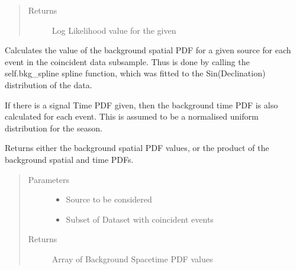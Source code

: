 \documentclass[letterpaper,10pt,english]{sphinxmanual}
\begin{document}
\begin{fulllineitems}
\begin{fulllineitems}
\begin{quote}
\begin{description}
\begin{itemize}
\end{itemize}

\item[{Returns}] \leavevmode
Log Likelihood value for the given

\end{description}\end{quote}

\end{fulllineitems}


\begin{fulllineitems}
\label{\detokenize{index:flarestack.core.llh.LLH.background_pdf}}
Calculates the value of the background spatial PDF for a given
source for each event in the coincident data subsample. Thus is done
by calling the self.bkg\_spline spline function, which was fitted to
the Sin(Declination) distribution of the data.

If there is a signal Time PDF given, then the background time PDF
is also calculated for each event. This is assumed to be a normalised
uniform distribution for the season.

Returns either the background spatial PDF values, or the product of the
background spatial and time PDFs.
\begin{quote}\begin{description}
\item[{Parameters}] \leavevmode\begin{itemize}
\item {} 
 \textendash{} Source to be considered

\item {} 
 \textendash{} Subset of Dataset with coincident events

\end{itemize}

\item[{Returns}] \leavevmode
Array of Background Spacetime PDF values

\end{description}\end{quote}

\end{fulllineitems}


\end{fulllineitems}
\end{document}
